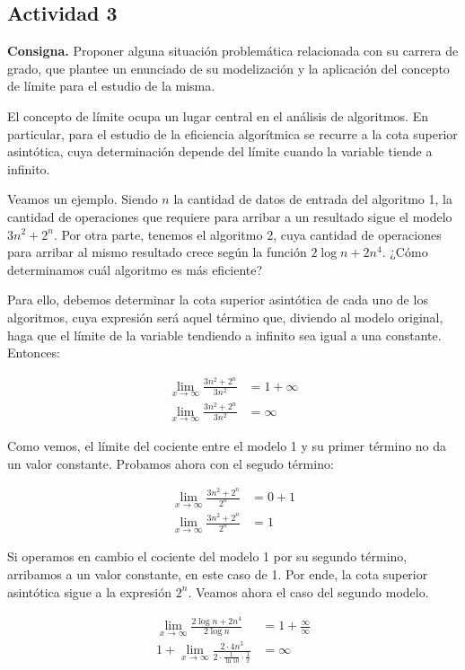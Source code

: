 \subsection*{Actividad 3}

\textbf{Consigna.}
Proponer alguna situación problemática relacionada con su carrera
de grado, que plantee un enunciado de su modelización y la
aplicación del concepto de límite para el estudio de la misma.

El concepto de límite ocupa un lugar central en el análisis de algoritmos.
En particular, para el estudio de la eficiencia algorítmica se recurre a la cota superior asintótica,
cuya determinación depende del límite cuando la variable tiende a infinito.

Veamos un ejemplo. Siendo $n$ la cantidad de datos de entrada del algoritmo 1, la cantidad de operaciones que requiere
para arribar a un resultado sigue el modelo $3n^2 + 2^n$. Por otra parte, tenemos el algoritmo 2, cuya cantidad de operaciones
para arribar al mismo resultado crece según la función $2 \log n + 2n^4$. ¿Cómo determinamos cuál algoritmo es más eficiente?

Para ello, debemos determinar la cota superior asintótica de cada uno de los algoritmos, cuya expresión será aquel término que, diviendo
al modelo original, haga que el límite de la variable tendiendo a infinito sea igual a una constante. Entonces:

\begin{align*}
    \lim_{x \to \infty} \frac{3n^2 + 2^n}{3n^2} & = 1 + \infty \\
    \lim_{x \to \infty} \frac{3n^2 + 2^n}{3n^2} & = \infty
\end{align*}

Como vemos, el límite del cociente entre el modelo 1 y su primer término no da un valor constante. Probamos ahora con el segudo término:

\begin{align*}
    \lim_{x \to \infty} \frac{3n^2 + 2^n}{2^n} & = 0 + 1 \\
    \lim_{x \to \infty} \frac{3n^2 + 2^n}{2^n} & = 1
\end{align*}

Si operamos en cambio el cociente del modelo 1 por su segundo término, arribamos a un valor constante, en este caso de 1. Por ende,
la cota superior asintótica sigue a la expresión $2^n$. Veamos ahora el caso del segundo modelo.

\begin{align*}
    \lim_{x \to \infty} \frac{2 \log n + 2n^4}{2 \log n }                                   & = 1 + \frac{\infty}{\infty} \\
    1 + \lim_{x \to \infty} \frac{2 \cdot 4n^3}{2 \cdot \frac{1}{\ln 10} \cdot \frac{1}{x}} & = \infty
\end{align*}

